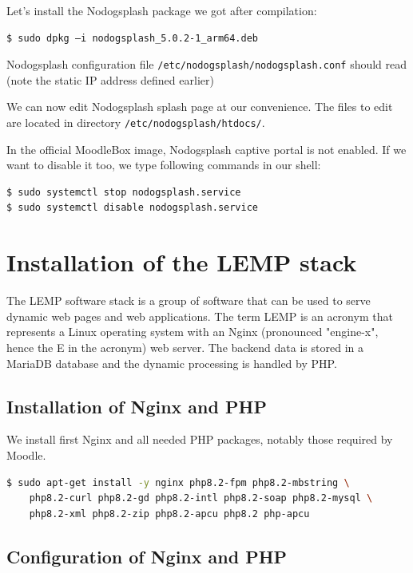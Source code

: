 \documentclass[12pt]{article}
\begin{document}
Let's install the Nodogsplash package we got after compilation:
\begin{lstlisting}[language=bash]
$ sudo dpkg –i nodogsplash_5.0.2-1_arm64.deb
\end{lstlisting}
Nodogsplash configuration file \lstinline{/etc/nodogsplash/nodogsplash.conf} should read (note the static IP address defined earlier)


We can now edit Nodogsplash splash page at our convenience.
The files to edit are located in directory \lstinline{/etc/nodogsplash/htdocs/}.

In the official MoodleBox image, Nodogsplash captive portal is not enabled.
If we want to disable it too, we type following commands in our shell:
\begin{lstlisting}[language=bash]
$ sudo systemctl stop nodogsplash.service
$ sudo systemctl disable nodogsplash.service
\end{lstlisting}

\section{Installation of the LEMP stack}

The LEMP software stack is a group of software that can be used to serve dynamic web pages and web applications.
The term LEMP is an acronym that represents a Linux operating system with an Nginx (pronounced "engine-x", hence the E in the acronym) web server.
The backend data is stored in a MariaDB database and the dynamic processing is handled by PHP.

\subsection{Installation of Nginx and PHP}\label{ssec-lemp}

We install first Nginx and all needed PHP packages, notably those required by Moodle.

\begin{lstlisting}[language=bash]
$ sudo apt-get install -y nginx php8.2-fpm php8.2-mbstring \
    php8.2-curl php8.2-gd php8.2-intl php8.2-soap php8.2-mysql \
    php8.2-xml php8.2-zip php8.2-apcu php8.2 php-apcu
\end{lstlisting}

\subsection{Configuration of Nginx and PHP}\label{ssec-nginx-php}
\end{document}
